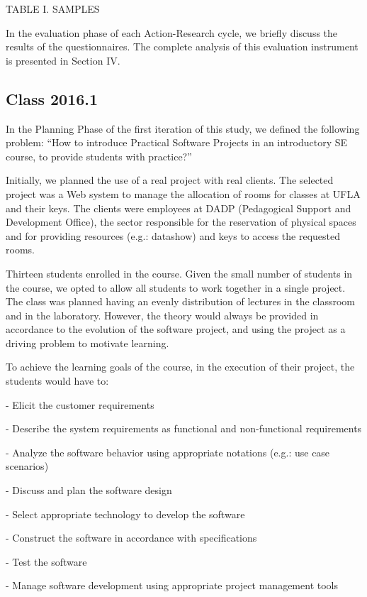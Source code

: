 TABLE I. SAMPLES

In the evaluation phase of each Action-Research cycle, we briefly discuss the results of the questionnaires. The complete analysis of this evaluation instrument is presented in Section IV.

\subsection{Class 2016.1}

In the Planning Phase of the first iteration of this study, we defined the following problem: “How to introduce Practical Software Projects in an introductory SE course, to provide students with practice?”

Initially, we planned the use of a real project with real clients. The selected project was a Web system to manage the allocation of rooms for classes at UFLA and their keys. The clients were employees at DADP (Pedagogical Support and Development Office), the sector responsible for the reservation of physical spaces and for providing resources (e.g.: datashow) and keys to access the requested rooms.

Thirteen students enrolled in the course. Given the small number of students in the course, we opted to allow all students to work together in a single project. The class was planned having an evenly distribution of lectures in the classroom and in the laboratory. However, the theory would always be provided in accordance to the evolution of the software project, and using the project as a driving problem to motivate learning.

To achieve the learning goals of the course, in the execution of their project, the students would have to:

-	Elicit the customer requirements

-	Describe the system requirements as functional and non-functional requirements

-	Analyze the software behavior using appropriate notations (e.g.: use case scenarios)

-	Discuss and plan the software design

-	Select appropriate technology to develop the software

-	Construct the software in accordance with specifications

-	Test the software

-	Manage software development using appropriate project management tools


